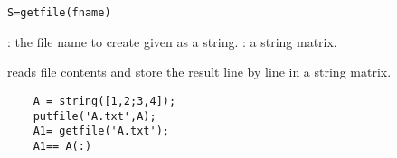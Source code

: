 
\begin{mandesc}
\end{mandesc}
\begin{calling_sequence}
\begin{verbatim}
S=getfile(fname)
\end{verbatim}
\end{calling_sequence}
\begin{parameters}
  \begin{varlist}
    : the file name to create given as a string.
    : a string matrix.
  \end{varlist}
\end{parameters}

\begin{mandescription}
reads file contents and store the result line by line in a string matrix.
\end{mandescription}

\begin{examples}
  \begin{Verbatim}
    A = string([1,2;3,4]);
    putfile('A.txt',A);
    A1= getfile('A.txt');
    A1== A(:)
  \end{Verbatim}
\end{examples}


\begin{manseealso}
\end{manseealso}
